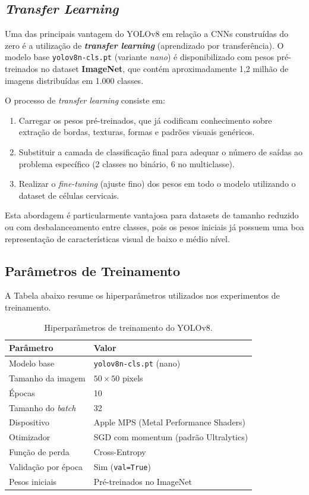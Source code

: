 \documentclass[12pt, a4paper]{article}
\begin{document}
\subsection{\textit{Transfer Learning}}

Uma das principais vantagem do YOLOv8 em relação a CNNs construídas do zero é a utilização de \textbf{\textit{transfer learning}} (aprendizado por transferência). O modelo base \texttt{yolov8n-cls.pt} (variante \textit{nano}) é disponibilizado com pesos pré-treinados no dataset \textbf{ImageNet}, que contém aproximadamente 1,2 milhão de imagens distribuídas em 1.000 classes.

O processo de \textit{transfer learning} consiste em:

\begin{enumerate}
    \item Carregar os pesos pré-treinados, que já codificam conhecimento sobre extração de bordas, texturas, formas e padrões visuais genéricos.
    \item Substituir a camada de classificação final para adequar o número de saídas ao problema específico (2 classes no binário, 6 no multiclasse).
    \item Realizar o \textit{fine-tuning} (ajuste fino) dos pesos em todo o modelo utilizando o dataset de células cervicais.
\end{enumerate}

Esta abordagem é particularmente vantajosa para datasets de tamanho reduzido ou com desbalanceamento entre classes, pois os pesos iniciais já possuem uma boa representação de características visual de baixo e médio nível.

\subsection{Parâmetros de Treinamento}

A Tabela abaixo resume os hiperparâmetros utilizados nos experimentos de treinamento.

\begin{table}[H]
\centering
\caption{Hiperparâmetros de treinamento do YOLOv8.}
\label{tab:parametros}
\begin{tabular}{ll}
\toprule
\textbf{Parâmetro} & \textbf{Valor} \\
\midrule
Modelo base            & \texttt{yolov8n-cls.pt} (nano) \\
Tamanho da imagem      & $50 \times 50$ pixels \\
Épocas                 & 10 \\
Tamanho do \textit{batch}  & 32 \\
Dispositivo            & Apple MPS (Metal Performance Shaders) \\
Otimizador             & SGD com momentum (padrão Ultralytics) \\
Função de perda        & Cross-Entropy \\
Validação por época    & Sim (\texttt{val=True}) \\
Pesos iniciais         & Pré-treinados no ImageNet \\
\bottomrule
\end{tabular}
\end{table}
\end{document}
